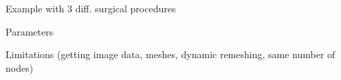 Example with 3 diff. surgical procedures

Parameters

Limitations (getting image data, meshes, dynamic remeshing, same number of nodes)
